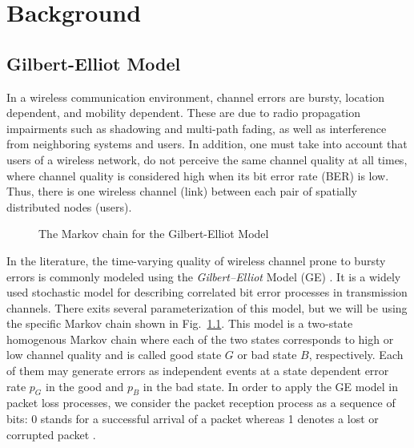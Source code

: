 \chapter{Background}



\section{Gilbert-Elliot Model} \label{sec:GE}

In a wireless communication environment, channel errors are bursty, location
dependent, and mobility dependent. These are due to radio propagation
impairments such as shadowing and multi-path fading, as well as interference
from neighboring systems and users. In addition, one must take into account that
users of a wireless network, do not perceive the same channel quality at all
times, where channel quality is considered high when its bit error rate (BER) is
low. Thus, there is one wireless channel (link) between each pair of spatially
distributed nodes (users). 

\begin{figure}[htb]
  \centering
   
  \caption{The Markov chain for the Gilbert-Elliot Model}
  \label{fig:GE_FSM}
\end{figure}

In the literature, the time-varying quality of wireless channel prone to bursty
errors is commonly modeled using the \textit{Gilbert–Elliot} Model (GE)
\cite{gilbert1960capacity, elliott1963estimates}. It is a widely used stochastic
model for describing correlated bit error processes in transmission channels.
There exits several parameterization of this model, but we will be using the
specific Markov chain shown in Fig.~\ref{fig:GE_FSM}. This model is a two-state
homogenous Markov chain where each of the two states corresponds to high or low
channel quality and is called good state $G$ or bad state $B$, respectively.
Each of them may generate errors as independent events at a state dependent
error rate $p_G$ in the good and $p_B$ in the bad state. In order to apply the
GE model in packet loss processes, we consider the packet reception process as a
sequence of bits: 0 stands for a successful arrival of a packet whereas 1
denotes a lost or corrupted packet \cite{hasslinger2008gilbert}.

